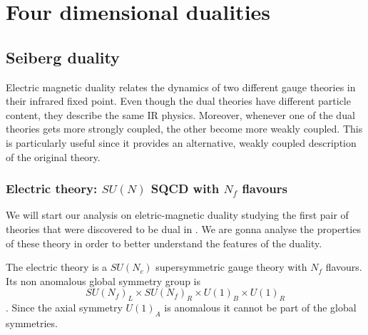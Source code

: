 
\chapter{Four dimensional dualities}



\section{Seiberg duality}
Electric magnetic duality relates the dynamics of two different gauge theories in their infrared fixed point.
Even though the dual theories have different particle content, they describe the same IR physics. 
Moreover, whenever one of the dual theories gets more strongly coupled, the other become more weakly coupled.
This is particularly useful since it provides an alternative, weakly coupled description of the original theory.




\subsection{Electric theory: $SU(N)$ SQCD with $N_f$ flavours }
We will start our analysis on eletric-magnetic duality studying the first pair of theories that were discovered to be dual in \cite{Seiberg:1994pq}.  
We are gonna analyse the properties of these theory in order to better understand the features of the duality.



The electric theory is a $SU(N_c) $ supersymmetric gauge theory with $N_f$ flavours.
Its non anomalous global symmetry group is 
$$
SU(N_f)_L \times SU(N_f)_R \times U(1)_B \times U(1)_R 
\label{eqn:seib_dual_global_symm_group}
$$.
Since the axial symmetry $U(1)_A$ is anomalous it cannot be part of the global symmetries.

